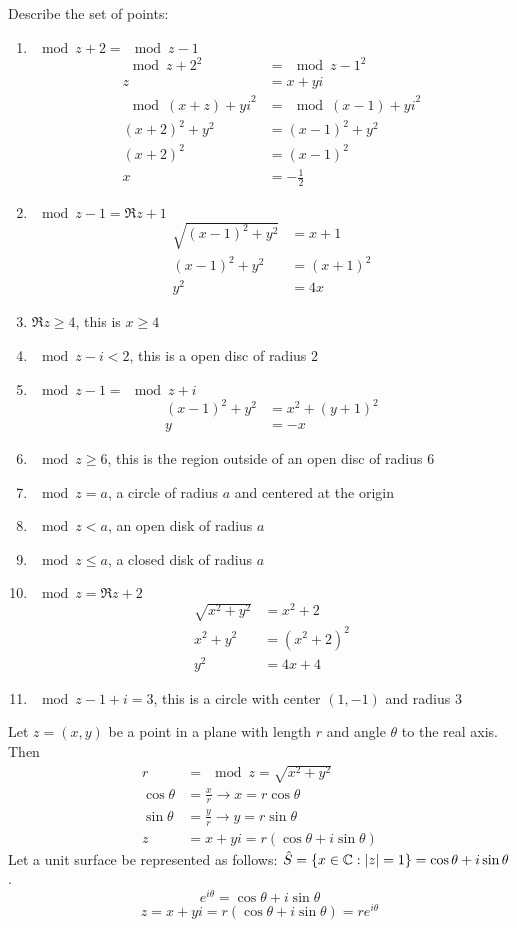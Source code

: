 \documentclass[12pt]{article}
\begin{document}
Describe the set of points: \begin{enumerate} 
\item $\mod{z + 2} = \mod{z - 1}$ $$ \begin{aligned} \mod{z+2}^2 &= \mod{z-1}^2 \\ z &= x + yi \\ \mod{(x+z) + yi}^2 &= \mod{(x-1) + yi}^2 \\ (x+2)^2 + y^2 &= (x-1)^2 + y^2 \\ (x+2)^2 &= (x-1)^2 \\ x &= -\frac{1}{2} \end{aligned} $$ 
\item $\mod{z-1} = \Re{z} + 1$ $$ \begin{aligned} \sqrt{(x-1)^2 + y^2} &= x + 1 \\ (x-1)^2 + y^2 &= (x+1)^2 \\ y^2 &= 4x \end{aligned} $$ 
\item $\Re{z} \geq 4$, this is $x \geq 4$ 
\item $\mod{z - i} < 2$, this is a open disc of radius $2$ 
\item $\mod{z-1} = \mod{z + i}$ $$ \begin{aligned} (x-1)^2 + y^2 &= x^2 + (y+1)^2 \\ y &= -x \end{aligned} $$ 
\item $\mod{z} \geq 6$, this is the region outside of an open disc of radius $6$ 
\item $\mod{z} = a$, a circle of radius $a$ and centered at the origin 
\item $\mod{z} < a$, an open disk of radius $a$
\item $\mod{z} \leq a$, a closed disk of radius $a$
\item $\mod{z} = \Re{z} + 2$ $$ \begin{aligned} \sqrt{x^2 + y^2} &= x^2 + 2 \\ x^2 + y^2 &= (x^2 + 2)^2 \\ y^2 &= 4x + 4 \end{aligned} $$ 
\item $\mod{z - 1 + i} = 3$, this is a circle with center $(1,-1)$ and radius $3$ \end{enumerate} 
Let $z = (x,y)$ be a point in a plane with length $r$ and angle $\theta$ to the real axis. Then $$ \begin{aligned} r &= \mod{z} = \sqrt{x^2 + y^2} \\ \cos\theta &= \frac{x}{r} \to x = r\cos\theta \\ \sin\theta &= \frac{y}{r} \to y = r\sin\theta \\ z &= x + yi = r(\cos\theta + i\sin\theta) \end{aligned} $$ 
Let a unit surface be represented as follows: $\hat{S} = \{ x \in \mathbb{C}: \abs{z} = 1\} = \cos \theta + i\sin \theta$. 
$$ e^{i\theta} = \cos\theta + i\sin\theta$$ 
$$ z = x + yi = r(\cos\theta + i\sin\theta) = re^{i\theta} $$ 
\end{document}
